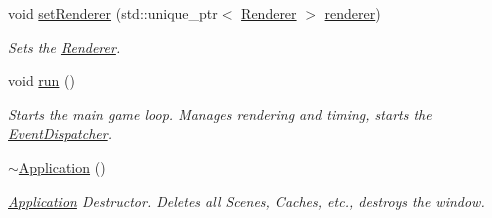 \begin{DoxyCompactItemize}
void \mbox{\hyperlink{classsage_1_1Application_a9b9d4014d4913a035e970a16bbc03199}{set\+Renderer}} (std\+::unique\+\_\+ptr$<$ \mbox{\hyperlink{classsage_1_1Renderer}{Renderer}} $>$ \mbox{\hyperlink{classsage_1_1Application_ac0297e6d65ef3662c807f4026f63c8ba}{renderer}})
\begin{DoxyCompactList}\small\item\em Sets the \mbox{\hyperlink{classsage_1_1Renderer}{Renderer}}. \end{DoxyCompactList}\item 
void \mbox{\hyperlink{classsage_1_1Application_a68965449404743bf1add056784d6cf81}{run}} ()
\begin{DoxyCompactList}\small\item\em Starts the main game loop. Manages rendering and timing, starts the \mbox{\hyperlink{classsage_1_1EventDispatcher}{Event\+Dispatcher}}. \end{DoxyCompactList}\item 
\mbox{\hyperlink{classsage_1_1Application_a748bca84fefb9c12661cfaa2f623748d}{$\sim$\+Application}} ()
\begin{DoxyCompactList}\small\item\em \mbox{\hyperlink{classsage_1_1Application}{Application}} Destructor. Deletes all Scenes, Caches, etc., destroys the window. \end{DoxyCompactList}\end{DoxyCompactItemize}
